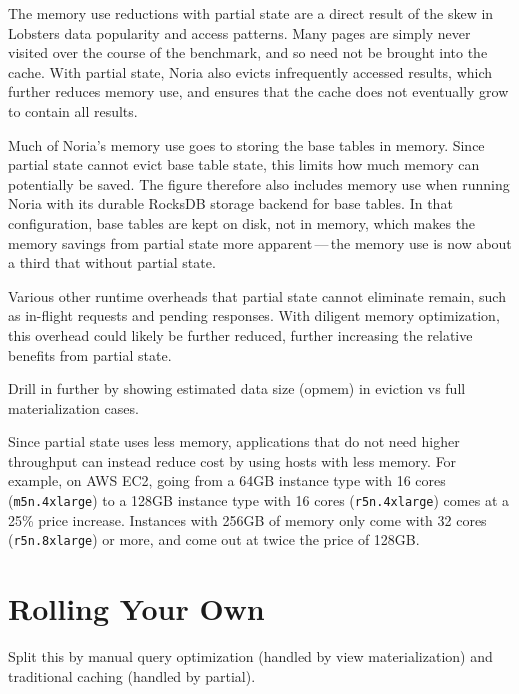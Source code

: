 The memory use reductions with partial state are a direct result of the skew in
Lobsters data popularity and access patterns. Many pages are simply never
visited over the course of the benchmark, and so need not be brought into the
cache. With partial state, Noria also evicts infrequently accessed results,
which further reduces memory use, and ensures that the cache does not eventually
grow to contain all results.

Much of Noria's memory use goes to storing the base tables in memory. Since
partial state cannot evict base table state, this limits how much memory can
potentially be saved. The figure therefore also includes memory use when running
Noria with its durable RocksDB storage backend for base tables. In that
configuration, base tables are kept on disk, not in memory, which makes the
memory savings from partial state more apparent\,---\,the memory use is now
about a third that without partial state.

Various other runtime overheads that partial state cannot eliminate
remain, such as in-flight requests and pending responses. With diligent memory
optimization, this overhead could likely be further reduced, further increasing
the relative benefits from partial state.

\begin{inprogress}
  Drill in further by showing estimated data size (opmem) in eviction vs full
  materialization cases.
\end{inprogress}

Since partial state uses less memory, applications that do not need higher
throughput can instead reduce cost by using hosts with less memory. For example,
on AWS EC2, going from a 64GB instance type with 16 cores (\texttt{m5n.4xlarge})
to a 128GB instance type with 16 cores (\texttt{r5n.4xlarge}) comes at a 25\%
price increase. Instances with 256GB of memory only come with 32 cores
(\texttt{r5n.8xlarge}) or more, and come out at twice the price of 128GB.

\section{Rolling Your Own}
\label{s:eval:alts}

\begin{inprogress}
  Split this by manual query optimization (handled by view materialization) and
  traditional caching (handled by partial).
\end{inprogress}

